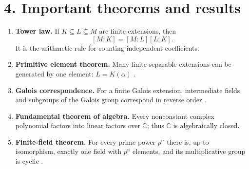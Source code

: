 \section*{4. Important theorems and results}
\begin{enumerate}[leftmargin=*,itemsep=0.35em]
\item \textbf{Tower law.} If $K\subseteq L\subseteq M$ are finite extensions, then
\[
[M:K]=[M:L][L:K].
\]
It is the arithmetic rule for counting independent coefficients.

\item \textbf{Primitive element theorem.} Many finite separable extensions can be generated by one element: $L=K(\alpha)$ \cite{field_theory_ref1}.

\item \textbf{Galois correspondence.} For a finite Galois extension, intermediate fields and subgroups of the Galois group correspond in reverse order \cite{field_theory_ref2}.

\item \textbf{Fundamental theorem of algebra.} Every nonconstant complex polynomial factors into linear factors over $\mathbb{C}$; thus $\mathbb{C}$ is algebraically closed.

\item \textbf{Finite-field theorem.} For every prime power $p^n$ there is, up to isomorphism, exactly one field with $p^n$ elements, and its multiplicative group is cyclic \cite{field_theory_ref3}.
\end{enumerate}

\theoryapplications
{}
